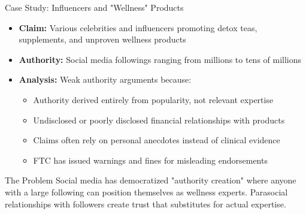 \documentclass{beamer}
\begin{document}
\begin{frame}{Case Study: Influencers and "Wellness" Products}
	\begin{itemize}
		\item \textbf{Claim:} Various celebrities and influencers promoting detox teas, supplements, and unproven wellness products
		\item \textbf{Authority:} Social media followings ranging from millions to tens of millions
		\item \textbf{Analysis:} Weak authority arguments because:
		\begin{itemize}
			\item Authority derived entirely from popularity, not relevant expertise
			\item Undisclosed or poorly disclosed financial relationships with products
			\item Claims often rely on personal anecdotes instead of clinical evidence
			\item FTC has issued warnings and fines for misleading endorsements
		\end{itemize}
	\end{itemize}
	
	\begin{alertblock}{The Problem}
		Social media has democratized "authority creation" where anyone with a large following can position themselves as wellness experts. Parasocial relationships with followers create trust that substitutes for actual expertise.
	\end{alertblock}
\end{frame}
\end{document}
